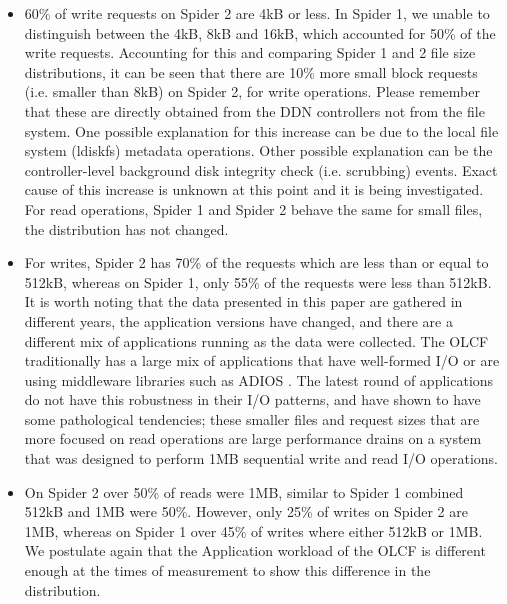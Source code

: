 \begin{itemize}

\item  60\% of write requests on Spider 2 are 4kB or less.  In Spider 1, we
unable to distinguish between the 4kB, 8kB and 16kB, which accounted for 50\%
of the write requests. Accounting for this and comparing Spider 1 and 2 file
size distributions, it can be seen that there are 10\% more small block
requests (i.e.  smaller than 8kB) on Spider 2, for write operations. Please
remember that these are directly obtained from the DDN controllers not from the
file system. One possible explanation for this increase can be due to the local
file system (ldiskfs) metadata operations. Other possible explanation can be
the controller-level background disk integrity check (i.e. scrubbing) events.
Exact cause of this increase is unknown at this point and it is being
investigated.  For read operations, Spider 1 and Spider 2 behave the same for
small files, the distribution has not changed.

\item  For writes, Spider 2 has 70\% of the requests which are less than or
equal to 512kB, whereas on Spider 1, only 55\% of the requests were less than
512kB. It is worth noting that the data presented in this paper are gathered in
different years, the application versions have changed, and there are a
different mix of applications running as the data were collected. The OLCF
traditionally has a large mix of applications that have well-formed I/O or are
using middleware libraries such as ADIOS \cite{adios}. The latest round of
applications do not have this robustness in their I/O patterns, and have shown
to have some pathological tendencies; these smaller files and request sizes
that are more focused on read operations are large performance drains on a
system that was designed to perform 1MB sequential write and read I/O
operations. 

\item On Spider 2 over 50\% of reads were 1MB, similar to Spider 1 combined
512kB and 1MB were 50\%. However, only 25\% of writes on Spider 2 are 1MB,
whereas on Spider 1 over 45\% of writes where either 512kB or 1MB. We postulate
again that the Application workload of the OLCF is different enough at the
times of measurement to show this difference in the distribution.


\end{itemize}
